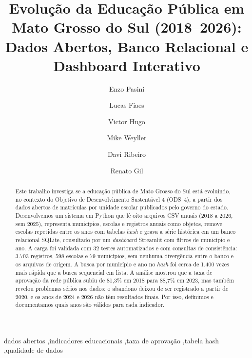 \documentclass[preprint,10pt,5p]{elsarticle}
\begin{document}
\begin{frontmatter}

\title{Evolução da Educação Pública em Mato Grosso do Sul (2018--2026):\\Dados Abertos, Banco Relacional e Dashboard Interativo}

\address[label1]{Universidade Católica Dom Bosco, Campo Grande, Brazil}

\author[label1]{Enzo Pasini}

\author[label1]{Lucas Fiaes}

\author[label1]{Victor Hugo}

\author[label1]{Mike Weyller}

\author[label1]{Davi Ribeiro}

\author[label1]{Renato Gil}


\begin{abstract}
Este trabalho investiga se a educação pública de Mato Grosso do Sul está evoluindo, no contexto do Objetivo de Desenvolvimento Sustentável 4 (ODS~4), a partir dos dados abertos de matrículas por unidade escolar publicados pelo governo do estado. Desenvolvemos um sistema em Python que lê oito arquivos CSV anuais (2018 a 2026, sem 2025), representa municípios, escolas e registros anuais como objetos, remove escolas repetidas entre os anos com tabelas \textit{hash} e grava a série histórica em um banco relacional SQLite, consultado por um \textit{dashboard} Streamlit com filtros de município e ano. A carga foi validada com 32 testes automatizados e com consultas de consistência: 3.703 registros, 598 escolas e 79 municípios, sem nenhuma divergência entre o banco e os arquivos de origem. A busca por município e ano no \textit{hash} foi cerca de 1.400 vezes mais rápida que a busca sequencial em lista. A análise mostrou que a taxa de aprovação da rede pública subiu de 81,3\% em 2018 para 88,7\% em 2023, mas também revelou problemas sérios nos dados: o abandono deixou de ser registrado a partir de 2020, e os anos de 2024 e 2026 não têm resultados finais. Por isso, definimos e documentamos quais anos são válidos para cada indicador.
\end{abstract}

\begin{keyword}
dados abertos \sep indicadores educacionais \sep taxa de aprovação \sep tabela hash \sep qualidade de dados
\end{keyword}


\end{frontmatter}
\end{document}
